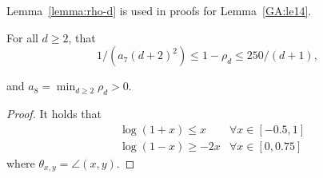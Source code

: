 Lemma~\ref{lemma:rho-d} is used in proofs for Lemma~\ref{GA:le14}.
\begin{lemma}\label{lemma:rho-d}
For all $d\geq 2$, that
\[
1/\left(a_7(d + 2)^2\right) \leq 1 - \rho_d \leq 250/(d + 1),
\]
\end{lemma}
and $a_8 = \min_{d \geq 2} \rho_d > 0$.
\begin{proof}

It holds that
\begin{align}
&\log(1+x) \leq x &\forall x \in [-0.5, 1] \label{GA:e47} \\
&\log(1-x) \geq -2 x &\forall x \in [0, 0.75] \label{GA:e48} %
\end{align}
where $\theta_{x, y} = \angle(x, y)$.



\end{proof}
